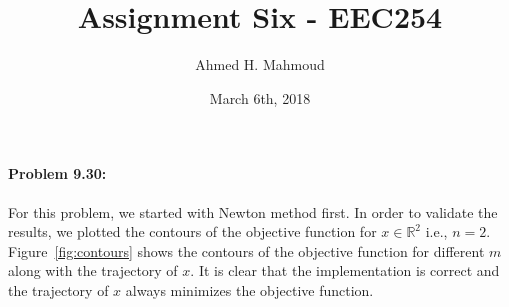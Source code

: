 \documentclass[12pt] {article}
\begin{document}
\title{Assignment Six -  EEC254}
\author{Ahmed H. Mahmoud}
\date{March 6th, 2018}
\maketitle




\paragraph{Problem 9.30:} 
For this problem, we started with Newton method first. In order to validate the results, we plotted the contours of the objective function for $x\in \mathbb{R}^2$ i.e., $n=2$. Figure~\ref{fig:contours} shows the contours of the objective function for different $m$ along with the trajectory of $x$. It is clear that the implementation is correct and the trajectory of $x$ always minimizes the objective function. 
\end{document}
